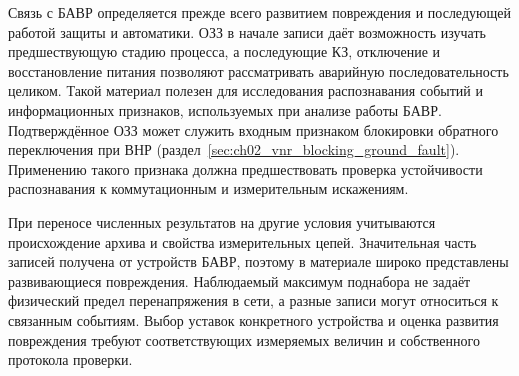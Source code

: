 Связь с БАВР определяется прежде всего развитием повреждения
и последующей работой защиты и автоматики. ОЗЗ в начале записи
даёт возможность изучать предшествующую стадию процесса,
а последующие КЗ, отключение и восстановление питания позволяют
рассматривать аварийную последовательность целиком.
Такой материал полезен для исследования распознавания событий
и информационных признаков, используемых при анализе работы БАВР. Подтверждённое ОЗЗ
может служить входным признаком блокировки обратного переключения при ВНР
(раздел~\ref{sec:ch02_vnr_blocking_ground_fault}). Применению такого признака должна
предшествовать проверка устойчивости распознавания к коммутационным и измерительным
искажениям.

При переносе численных результатов на другие условия учитываются
происхождение архива и свойства измерительных цепей. Значительная
часть записей получена от устройств БАВР, поэтому в материале
широко представлены развивающиеся повреждения. Наблюдаемый
максимум поднабора не задаёт физический предел перенапряжения
в сети, а разные записи могут относиться к связанным событиям.
Выбор уставок конкретного устройства и оценка развития повреждения
требуют соответствующих измеряемых величин и собственного
протокола проверки.

